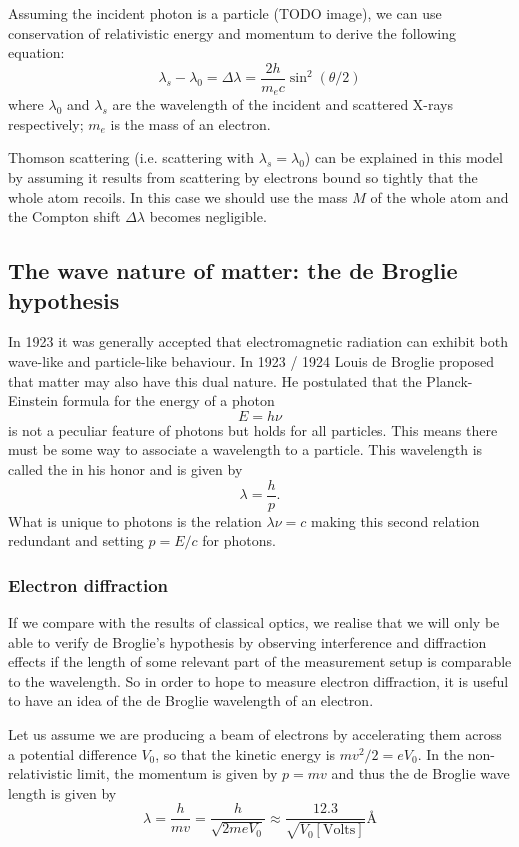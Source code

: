 Assuming the incident photon is a particle (TODO image), we can use conservation of relativistic energy and momentum to derive the following equation:
\[ \lambda_s - \lambda_0 = \Delta \lambda = \frac{2h}{m_e c}\sin^2(\theta/2) \]
where $\lambda_0$ and $\lambda_s$ are the wavelength of the incident and scattered X-rays respectively; $m_e$ is the mass of an electron.

Thomson scattering (i.e. scattering with $\lambda_s = \lambda_0$) can be explained in this model by assuming it results from scattering by electrons bound so tightly that the whole atom recoils. In this case we should use the mass $M$ of the whole atom and the Compton shift $\Delta \lambda$ becomes negligible.

\subsection{The wave nature of matter: the de Broglie hypothesis}
In 1923 it was generally accepted that electromagnetic radiation can exhibit both wave-like and particle-like behaviour. In 1923 / 1924 Louis de Broglie proposed that matter may also have this dual nature. He postulated that the Planck-Einstein formula for the energy of a photon
\[ E  = h\nu \]
is not a peculiar feature of photons but holds for all particles. This means there must be some way to associate a wavelength to a particle. This wavelength is called the  in his honor and is given by
\[ \lambda = \frac{h}{p}. \]
What is unique to photons is the relation $\lambda\nu = c$ making this second relation redundant and setting $p = E / c$ for photons.

\subsubsection{Electron diffraction}
If we compare with the results of classical optics, we realise that we will only be able to verify de Broglie's hypothesis by observing interference and diffraction effects if the length of some relevant part of the measurement setup is comparable to the wavelength. So in order to hope to measure electron diffraction, it is useful to have an idea of the de Broglie wavelength of an electron.

Let us assume we are producing a beam of electrons by accelerating them across a potential difference $V_0$, so that the kinetic energy is $mv^2/2 = eV_0$. In the non-relativistic limit, the momentum is given by $p=mv$ and thus the de Broglie wave length is given by
\[ \lambda = \frac{h}{mv} = \frac{h}{\sqrt{2meV_0}} \approx \frac{12.3}{\sqrt{V_0[\text{Volts}]}}\si{\angstrom} \]

